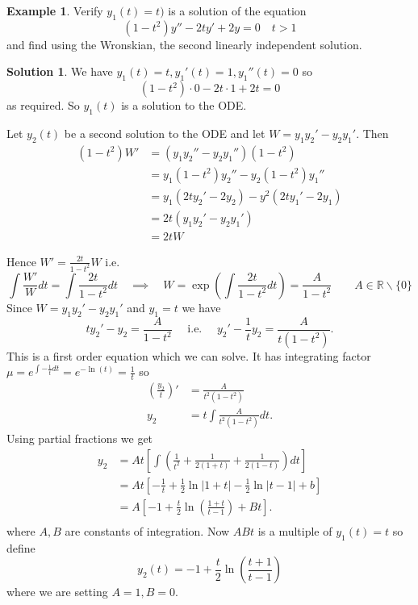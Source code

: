 \documentclass{article}
\theoremstyle{plain}
\theoremstyle{definition}
\newtheorem{exmp}{Example}[section]
\newtheorem*{sol}{Solution}
\numberwithin{equation}{section}
\begin{document}
\begin{tcolorbox}
    \begin{exmp}\label{exmp:RedofOrder2}
        Verify $y_1(t) = t)$ is a solution of the equation
        \[
            (1-t^2)y'' - 2ty' + 2y = 0 \quad t>1
        \]
        and find using the Wronskian, the second linearly independent solution.
    \end{exmp}
    \begin{sol}
        We have $y_1(t) = t, y_1'(t) = 1, y_1''(t) = 0$ so
        \[
            (1-t^2)\cdot 0 -2t \cdot 1 + 2t = 0
        \]
        as required. So $y_1(t)$ is a solution to the ODE.

        Let $y_2(t)$ be a second solution to the ODE and let $W = y_1y_2' - y_2y_1'$. Then
        \begin{align*}
            (1-t^2)W' &= (y_1y_2'' - y_2y_1'')(1-t^2) \\
            &= y_1(1-t^2)y_2'' - y_2(1-t^2)y_1'' \\
            &= y_1(2ty_2' - 2y_2) - y^2(2ty_1' - 2y_1) \\
            &= 2t(y_1y_2' - y_2y_1') \\
            &= 2tW
        \end{align*}
    \end{sol}
\end{tcolorbox}
\begin{tcolorbox}
        Hence $W' = \frac{2t}{1-t^2}W$ i.e.
        \[
        \int \frac{W'}{W} dt = \int \frac{2t}{1-t^2} dt \quad
        \implies \quad W = \exp\left(\int \frac{2t}{1-t^2} dt \right) 
        = \frac{A}{1-t^2} \qquad A \in \mathbb{R}\backslash\{0\}        
        \]
        Since $W = y_1y_2' - y_2y_1'$ and $y_1=t$ we have
        \[
        ty_2'-y_2 = \frac{A}{1-t^2} \quad \text{ i.e. } \quad y_2'-\frac{1}{t}y_2 = \frac{A}{t(1-t^2)}.
        \]
        This is a first order equation which we can solve. It has integrating factor $\mu = e^{\int -\frac{1}{t}dt} = e^{-\ln(t)}=\frac{1}{t}$ so
        \begin{align*}
            \left( \frac{y_2}{t} \right)' &= \frac{A}{t^2(1-t^2)} \\
            y_2 &= t \int \frac{A}{t^2(1-t^2)} dt.
        \end{align*}
        Using partial fractions we get
        \begin{align*}
            y_2 &= At \left[ \int \left( \frac{1}{t^2} + \frac{1}{2(1+t)} + \frac{1}{2(1-t)}\right) dt \right] \\
            &= At \left[ -\frac{1}{t} + \frac{1}{2} \ln \left\vert 1+t \right\vert - \frac{1}{2} \ln \left\vert t-1 \right\vert + b\right] \\
            &= A \left[ -1 + \frac{t}{2}\ln\left( \frac{1+t}{t-1} \right) + Bt \right].\\
        \end{align*}
        where $A,B$ are constants of integration. Now $ABt$ is a multiple of $y_1(t) = t$ so define
        \[
            y_2(t) = -1 + \frac{t}{2}\ln \left( \frac{t+1}{t-1} \right)
        \]
        where we are setting $A=1, B=0$.
    
\end{tcolorbox}
\end{document}
